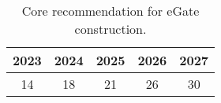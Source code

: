 \begin{table}[ht]
\centering
\begin{tabular}{ccccc}
  \hline
{\textbf{2023}} & {\textbf{2024}} & {\textbf{2025}} & {\textbf{2026}} & {\textbf{2027}} \\ 
  \hline
 14 &  18 &  21 &  26 &  30 \\ 
   \hline
\end{tabular}
\caption{Core recommendation for eGate construction. \label{tab:core_recommendation}} 
\end{table}
